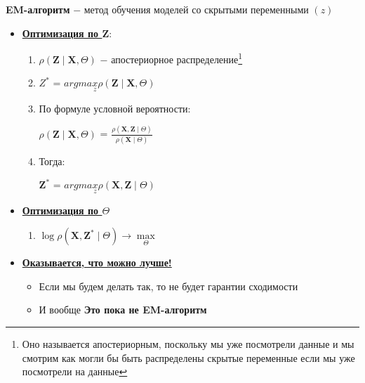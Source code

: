         \textbf{EM-алгоритм} $-$ метод обучения моделей со скрытыми переменными $(z)$

        \begin{itemize}
            \item \textbf{\underline{Оптимизация по $\mathbf{Z}$}}:
            \begin{enumerate}
                \item $\rho(\mathbf{Z} \mid \mathbf{X}, \Theta)$ $-$ апостериорное распределение\footnote{Оно называется апостериорным, поскольку мы уже посмотрели данные  и мы смотрим как могли бы быть распределены скрытые переменные если мы уже посмотрели на данные}

                \item \begin{center}
                    \Large
                    $Z^*$ = $argmax\limits_{z} \rho(\mathbf{Z} \mid \mathbf{X}, \Theta)$
                \end{center}

                \item По формуле условной вероятности:
                \begin{center}
                    \Large
                    $\rho(\mathbf{Z} \mid \mathbf{X}, \Theta)$ = $\frac{\rho(\mathbf{X}, \mathbf{Z} \mid \Theta)}{\rho(\mathbf{X} \mid \Theta)}$
                \end{center}

                \item Тогда:
                \begin{center}
                    \Large
                    $\mathbf{Z}^*$ = $argmax\limits_{z} \rho(\mathbf{X}, \mathbf{Z} \mid \Theta)$
                \end{center}
            \end{enumerate}


            \item \underline{\textbf{Оптимизация по $\Theta$}}
                \begin{enumerate}
                    \item \begin{center}
                        \Large
                        $\log \rho(\mathbf{X}, \mathbf{Z}^* \mid \Theta) \longrightarrow \max\limits_{\Theta}$
                    \end{center}
                \end{enumerate}

            \item \underline{\textbf{Оказывается, что можно лучше!}}
            \begin{itemize}
                \item Если мы будем делать так, то не будет гарантии сходимости 
                \item И вообще \textbf{Это пока не EM-алгоритм }
            \end{itemize}


\end{itemize}
